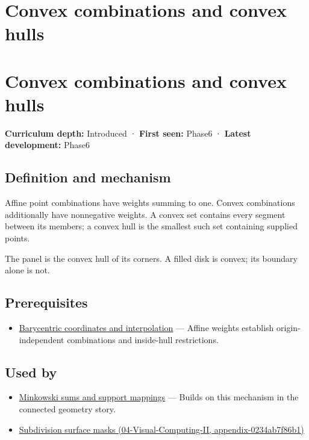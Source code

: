 \hypertarget{appendix-0026ec42c9d5}{}
\section*{Convex combinations and convex hulls}
\section{Convex combinations and convex hulls}\label{convex-combinations-and-convex-hulls}

\textbf{Curriculum depth:} Introduced · \textbf{First seen:} Phase6 · \textbf{Latest development:} Phase6

\subsection{Definition and mechanism}\label{definition-and-mechanism}

Affine point combinations have weights summing to one. Convex combinations additionally have nonnegative weights. A convex set contains every segment between its members; a convex hull is the smallest such set containing supplied points.

The panel is the convex hull of its corners. A filled disk is convex; its boundary alone is not.

\subsection{Prerequisites}\label{prerequisites}

\begin{itemize}
\tightlist
\item
  \hyperref[appendix-02b9d9a81dca]{Barycentric coordinates and interpolation} --- Affine weights establish origin-independent combinations and inside-hull restrictions.
\end{itemize}

\subsection{Used by}\label{used-by}

\begin{itemize}
\tightlist
\item
  \hyperref[appendix-215ac7099a82]{Minkowski sums and support mappings} --- Builds on this mechanism in the connected geometry story.
\item
  \href{}{Subdivision surface masks (04-Visual-Computing-II, appendix-0234ab7f86b1)}
\end{itemize}

